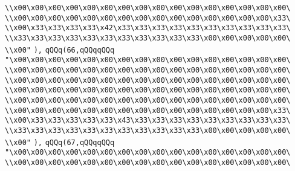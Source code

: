 \verb|\\x00\x00\x00\x00\x00\x00\x00\x00\x00\x00\x00\x00\x00\x00\x00\x00\|\newline
\verb|\\x00\x00\x00\x00\x00\x00\x00\x00\x00\x00\x00\x00\x00\x00\x00\x33\|\newline
\verb|\\x00\x33\x33\x33\x33\x42\x33\x33\x33\x33\x33\x33\x33\x33\x33\x33\|\newline
\verb|\\x33\x33\x33\x33\x33\x33\x33\x33\x33\x33\x33\x00\x00\x00\x00\x00\|\newline
\verb|\\x00"|\newline
\verb|),|\newline
\verb|qQQq(66,qQQqqQQq|\newline
\verb|"\x00\x00\x00\x00\x00\x00\x00\x00\x00\x00\x00\x00\x00\x00\x00\x00\|\newline
\verb|\\x00\x00\x00\x00\x00\x00\x00\x00\x00\x00\x00\x00\x00\x00\x00\x00\|\newline
\verb|\\x00\x00\x00\x00\x00\x00\x00\x00\x00\x00\x00\x00\x00\x00\x00\x00\|\newline
\verb|\\x00\x00\x00\x00\x00\x00\x00\x00\x00\x00\x00\x00\x00\x00\x00\x00\|\newline
\verb|\\x00\x00\x00\x00\x00\x00\x00\x00\x00\x00\x00\x00\x00\x00\x00\x00\|\newline
\verb|\\x00\x00\x00\x00\x00\x00\x00\x00\x00\x00\x00\x00\x00\x00\x00\x33\|\newline
\verb|\\x00\x33\x33\x33\x33\x33\x43\x33\x33\x33\x33\x33\x33\x33\x33\x33\|\newline
\verb|\\x33\x33\x33\x33\x33\x33\x33\x33\x33\x33\x33\x00\x00\x00\x00\x00\|\newline
\verb|\\x00"|\newline
\verb|),|\newline
\verb|qQQq(67,qQQqqQQq|\newline
\verb|"\x00\x00\x00\x00\x00\x00\x00\x00\x00\x00\x00\x00\x00\x00\x00\x00\|\newline
\verb|\\x00\x00\x00\x00\x00\x00\x00\x00\x00\x00\x00\x00\x00\x00\x00\x00\|\newline
